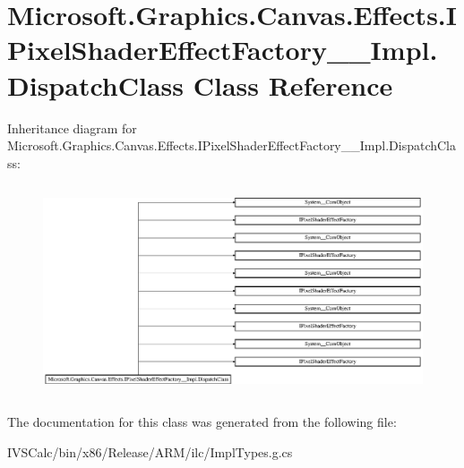 \hypertarget{class_microsoft_1_1_graphics_1_1_canvas_1_1_effects_1_1_i_pixel_shader_effect_factory_____impl_1_1_dispatch_class}{}\section{Microsoft.\+Graphics.\+Canvas.\+Effects.\+I\+Pixel\+Shader\+Effect\+Factory\+\_\+\+\_\+\+Impl.\+Dispatch\+Class Class Reference}
\label{class_microsoft_1_1_graphics_1_1_canvas_1_1_effects_1_1_i_pixel_shader_effect_factory_____impl_1_1_dispatch_class}
Inheritance diagram for Microsoft.\+Graphics.\+Canvas.\+Effects.\+I\+Pixel\+Shader\+Effect\+Factory\+\_\+\+\_\+\+Impl.\+Dispatch\+Class\+:\begin{figure}[H]
\begin{center}
\leavevmode
\includegraphics[height=6.285715cm]{class_microsoft_1_1_graphics_1_1_canvas_1_1_effects_1_1_i_pixel_shader_effect_factory_____impl_1_1_dispatch_class}
\end{center}
\end{figure}


The documentation for this class was generated from the following file\+:\begin{DoxyCompactItemize}
\item 
I\+V\+S\+Calc/bin/x86/\+Release/\+A\+R\+M/ilc/Impl\+Types.\+g.\+cs\end{DoxyCompactItemize}

